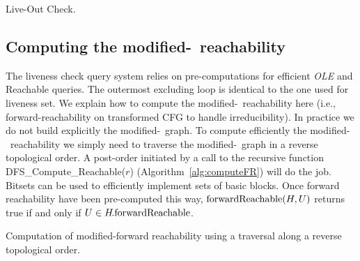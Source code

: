 \begin{algorithm}
  \caption{Live-Out Check.}
  \label{alg:liveoutchk}
\end{algorithm}


\subsection{Computing the modified-\reduced\ reachability}

The liveness check query system relies on pre-computations for efficient \textit{OLE} and \textrm{{\reduced}Reachable} queries.
The outermost excluding loop is identical to the one used for liveness set.
We explain how to compute the modified-\reduced\ reachability here (i.e., 
forward-reachability on transformed CFG to handle irreducibility).
In practice we do not build explicitly the modified-\reduced\ graph.
To compute efficiently the modified-\reduced\ reachability we simply need to traverse the modified-\reduced\ graph in a reverse topological order.
A post-order initiated by a call to the recursive function \textrm{DFS\_Compute\_{\reduced}Reachable}($r$) (Algorithm~\ref{alg:computeFR}) will do the job.
Bitsets can be used to efficiently implement sets of basic blocks.
Once forward reachability have been pre-computed this way, $\textrm{{forward}Reachable}(H,U)$ returns true if and only if $U\in H\!.\textrm{{forward}Reachable}$.

\begin{algorithm}
\caption{Computation of modified-forward reachability using a traversal along a reverse topological order.}
\label{alg:computeFR}
\end{algorithm}

